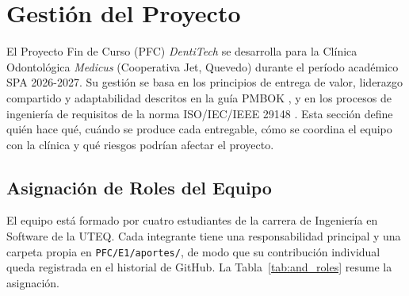 
\section{Gesti{\'o}n del Proyecto}

El Proyecto Fin de Curso (PFC) \textit{DentiTech} se desarrolla para la Cl{\'i}nica Odontol{\'o}gica \textit{Medicus} (Cooperativa Jet, Quevedo) durante el per{\'i}odo acad{\'e}mico SPA 2026-2027. Su gesti{\'o}n se basa en los principios de entrega de valor, liderazgo compartido y adaptabilidad descritos en la gu{\'i}a PMBOK \cite{pmbok2021}, y en los procesos de ingenier{\'i}a de requisitos de la norma ISO/IEC/IEEE 29148 \cite{iso29148}. Esta secci{\'o}n define qui{\'e}n hace qu{\'e}, cu{\'a}ndo se produce cada entregable, c{\'o}mo se coordina el equipo con la cl{\'i}nica y qu{\'e} riesgos podr{\'i}an afectar el proyecto.

\subsection{Asignaci{\'o}n de Roles del Equipo}

El equipo est{\'a} formado por cuatro estudiantes de la carrera de Ingenier{\'i}a en Software de la UTEQ. Cada integrante tiene una responsabilidad principal y una carpeta propia en \texttt{PFC/E1/aportes/}, de modo que su contribuci{\'o}n individual queda registrada en el historial de GitHub. La Tabla~\ref{tab:and_roles} resume la asignaci{\'o}n.

